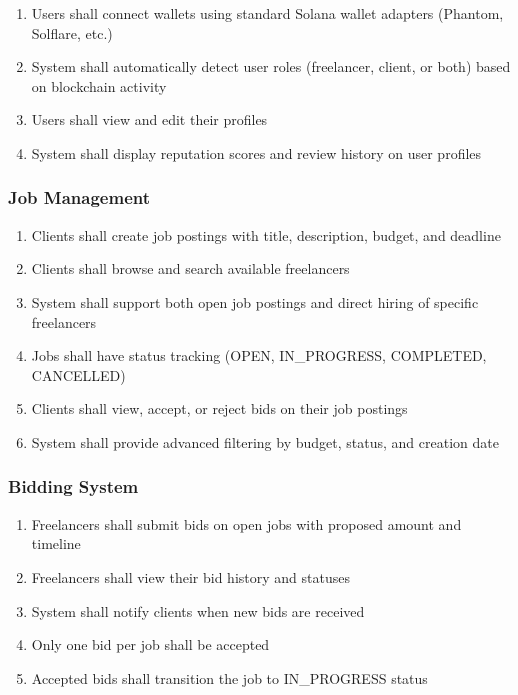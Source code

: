 \documentclass[a4paper,13pt,twoside]{report}
\theoremstyle{definition}
\begin{document}
\begin{enumerate}
    \item Users shall connect wallets using standard Solana wallet adapters (Phantom, Solflare, etc.)
    \item System shall automatically detect user roles (freelancer, client, or both) based on blockchain activity
    \item Users shall view and edit their profiles
    \item System shall display reputation scores and review history on user profiles
\end{enumerate}

\subsubsection{Job Management}

\begin{enumerate}
    \item Clients shall create job postings with title, description, budget, and deadline
    \item Clients shall browse and search available freelancers
    \item System shall support both open job postings and direct hiring of specific freelancers
    \item Jobs shall have status tracking (OPEN, IN\_PROGRESS, COMPLETED, CANCELLED)
    \item Clients shall view, accept, or reject bids on their job postings
    \item System shall provide advanced filtering by budget, status, and creation date
\end{enumerate}

\subsubsection{Bidding System}

\begin{enumerate}
    \item Freelancers shall submit bids on open jobs with proposed amount and timeline
    \item Freelancers shall view their bid history and statuses
    \item System shall notify clients when new bids are received
    \item Only one bid per job shall be accepted
    \item Accepted bids shall transition the job to IN\_PROGRESS status
\end{enumerate}
\end{document}
